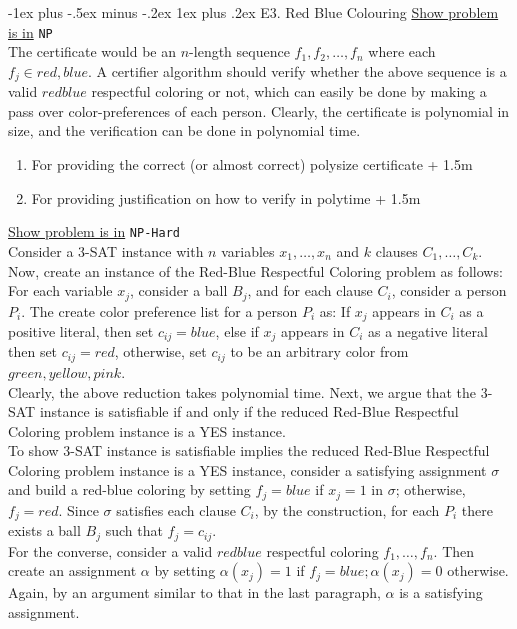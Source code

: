 \documentclass[10pt,landscape]{article}
\makeatletter
\newcommand{\subsubsubsection}{\@startsection{subsubsection}{3}{0mm}%
                                {-1ex plus -.5ex minus -.2ex}%
                                {1ex plus .2ex}%
                                {\normalfont\scriptsize\bfseries}}
\newcommand{\1}{\mathmybb{1}}
\makeatother
\begin{document}
\begin{multicols*}{3}
\subsubsubsection{E3. Red Blue Colouring}
\underline{Show problem is in} \verb|NP| \\ 
The certificate would be an $n$-length sequence $f_1, f_2, \ldots , f_n$ where each $f_j \in {red, blue}$. A
certifier algorithm should verify whether the above sequence is a valid $red blue$ respectful
coloring or not, which can easily be done by making a pass over color-preferences of each person.
Clearly, the certificate is polynomial in size, and the verification can be done in polynomial time.
\begin{enumerate}[topsep=0pt,noitemsep,wide=0pt, leftmargin=\dimexpr\labelwidth + 2\labelsep\relax]
  \item For providing the correct (or almost correct) polysize certificate + 1.5m
  \item For providing justification on how to verify in polytime + 1.5m
\end{enumerate}
\underline{Show problem is in} \verb|NP-Hard| \\ 
Consider a 3-SAT instance with $n$ variables $x_1, \ldots, x_n$ and $k$ clauses $C_1, \ldots , C_k$. Now, create an instance of the Red-Blue Respectful Coloring problem as follows: For each variable $x_j$, consider a ball $B_j$, and for each clause $C_i$, consider a person $P_i$. The create color preference list for a person $P_i$ as: If $x_j$ appears in $C_i$ as a positive literal, then set $c_{ij} = blue$, else if $x_j$ appears
in $C_i$ as a negative literal then set $c_{ij} = red$, otherwise, set  $c_{ij}$ to be an arbitrary color from ${green, yellow, pink}$. \\
Clearly, the above reduction takes polynomial time. Next, we argue that the 3-SAT instance is satisfiable if and only if the reduced Red-Blue Respectful Coloring problem instance is a YES instance.\\
To show 3-SAT instance is satisfiable implies the reduced Red-Blue Respectful Coloring problem instance is a YES instance, consider a satisfying assignment $\sigma$ and build a red-blue coloring by setting $f_j = blue$ if $x_j = 1$ in $\sigma$; otherwise, $f_j = red$. Since $\sigma$ satisfies each
clause $C_i$, by the construction, for each $P_i$ there exists a ball $B_j$ such that $f_j = c_{ij}$. \\ 
For the converse, consider a valid $red blue$ respectful coloring $f_1,\ldots , f_n$. Then create an
assignment $\alpha$ by setting $\alpha(x_j) = 1$ if $f_j = blue; \alpha(x_j) = 0$ otherwise. Again, by an argument
similar to that in the last paragraph, $\alpha$ is a satisfying assignment.


\end{multicols*}
\end{document}
